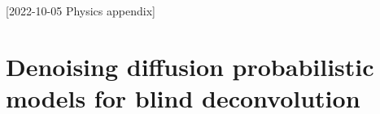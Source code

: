 [2022-10-05 Physics appendix]

\chapter{Denoising diffusion probabilistic models for blind deconvolution}


